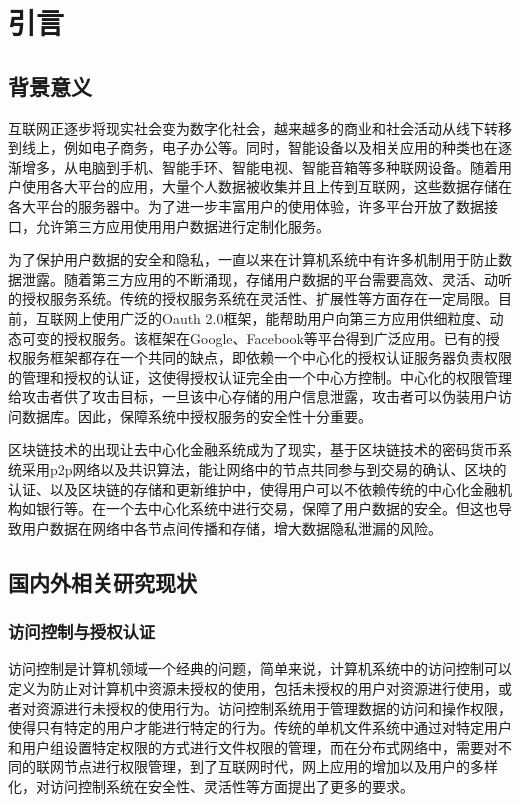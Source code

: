 
\chapter{引言}
\label{cha:intro}

\section{背景意义}

互联网正逐步将现实社会变为数字化社会，越来越多的商业和社会活动从线下转移到线上，例如电子商务，电子办公等。同时，智能设备以及相关应用的种类也在逐渐增多，从电脑到手机、智能手环、智能电视、智能音箱等多种联网设备。随着用户使用各大平台的应用，大量个人数据被收集并且上传到互联网，这些数据存储在各大平台的服务器中。为了进一步丰富用户的使用体验，许多平台开放了数据接口，允许第三方应用使用用户数据进行定制化服务。

为了保护用户数据的安全和隐私，一直以来在计算机系统中有许多机制用于防止数据泄露。随着第三方应用的不断涌现，存储用户数据的平台需要高效、灵活、动听的授权服务系统。传统的授权服务系统在灵活性、扩展性等方面存在一定局限。目前，互联网上使用广泛的Oauth 2.0框架，能帮助用户向第三方应用供细粒度、动态可变的授权服务。该框架在Google、Facebook等平台得到广泛应用。已有的授权服务框架都存在一个共同的缺点，即依赖一个中心化的授权认证服务器负责权限的管理和授权的认证，这使得授权认证完全由一个中心方控制。中心化的权限管理给攻击者供了攻击目标，一旦该中心存储的用户信息泄露，攻击者可以伪装用户访问数据库。因此，保障系统中授权服务的安全性十分重要。

区块链技术的出现让去中心化金融系统成为了现实，基于区块链技术的密码货币系统采用p2p网络以及共识算法，能让网络中的节点共同参与到交易的确认、区块的认证、以及区块链的存储和更新维护中，使得用户可以不依赖传统的中心化金融机构如银行等。在一个去中心化系统中进行交易，保障了用户数据的安全。但这也导致用户数据在网络中各节点间传播和存储，增大数据隐私泄漏的风险。

\section{国内外相关研究现状}

\subsection{访问控制与授权认证}

访问控制是计算机领域一个经典的问题，简单来说，计算机系统中的访问控制可以定义为防止对计算机中资源未授权的使用，包括未授权的用户对资源进行使用，或者对资源进行未授权的使用行为。访问控制系统用于管理数据的访问和操作权限，使得只有特定的用户才能进行特定的行为。传统的单机文件系统中通过对特定用户和用户组设置特定权限的方式进行文件权限的管理，而在分布式网络中，需要对不同的联网节点进行权限管理，到了互联网时代，网上应用的增加以及用户的多样化，对访问控制系统在安全性、灵活性等方面提出了更多的要求。

